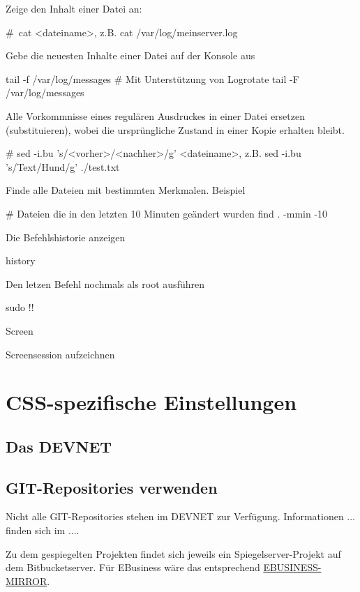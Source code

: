 \documentclass[]{article}
\begin{document}
Zeige den Inhalt einer Datei an:
\begin{bashcode}
# cat <dateiname>, z.B.
cat /var/log/meinserver.log
\end{bashcode}

Gebe die neuesten Inhalte einer Datei auf der Konsole aus
\begin{bashcode}
tail -f /var/log/messages
# Mit Unterstützung von Logrotate
tail -F /var/log/messages
\end{bashcode}

Alle Vorkommnisse eines regulären Ausdruckes in einer Datei ersetzen (substituieren), wobei die ursprüngliche Zustand in einer Kopie erhalten bleibt.
\begin{bashcode}
# sed -i.bu 's/<vorher>/<nachher>/g' <dateiname>, z.B.
sed -i.bu 's/Text/Hund/g' ./test.txt
\end{bashcode}

Finde alle Dateien mit bestimmten Merkmalen. Beispiel
\begin{bashcode}
# Dateien die in den letzten 10 Minuten geändert wurden 
find . -mmin -10
\end{bashcode}

Die Befehlshistorie anzeigen
\begin{bashcode}
history
\end{bashcode}

Den letzen Befehl nochmals als root ausführen
\begin{bashcode}
sudo !!
\end{bashcode}

Screen

Screensession aufzeichnen

\section{CSS-spezifische Einstellungen}
\subsection{Das DEVNET}
\subsection{GIT-Repositories verwenden}
Nicht alle GIT-Repositories stehen im DEVNET zur Verfügung. Informationen ... finden sich im ....

Zu dem gespiegelten Projekten findet sich jeweils ein Spiegelserver-Projekt auf dem Bitbucketserver. 
Für EBusiness wäre das entsprechend \href{https://git.css.ch/projects/EBUSINESS-MIRROR}{EBUSINESS-MIRROR}.
\end{document}
